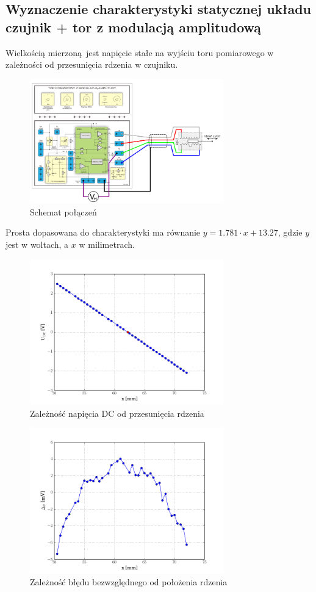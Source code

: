 \documentclass[a4paper, 12pt, titlepage]{article}
\begin{document}
		\subsection{Wyznaczenie charakterystyki statycznej układu czujnik + tor z modulacją amplitudową}
			Wielkością mierzoną jest napięcie stałe na wyjściu toru pomiarowego w zależności od przesunięcia rdzenia w czujniku.
			\begin{figure}[H]
				\centering
				\includegraphics[width=0.75\textwidth]{./img/trzecie_tor.png}
				\caption{\small{Schemat połączeń}}
			\end{figure} \noindent
			Prosta dopasowana do charakterystyki ma równanie $y = 1.781 \cdot x + 13.27$, gdzie $y$ jest w woltach, a $x$ w milimetrach.
			\begin{figure}[H]
				\centering
				\includegraphics[width=0.75\textwidth]{./img/Udc_od_x.png}
				\caption{\small{Zależność napięcia DC od przesunięcia rdzenia}}
			\end{figure} \noindent
			\begin{figure}[H]
				\centering
				\includegraphics[width=0.75\textwidth]{./img/Udc_blad.png}
				\caption{\small{Zależność błędu bezwzględnego od położenia rdzenia}}
			\end{figure} \noindent
\end{document}
